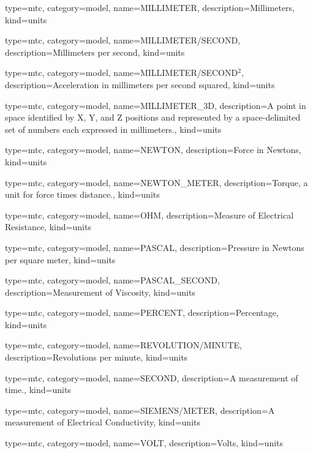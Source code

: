 {
  type=mtc,
  category=model,
  name={MILLIMETER},
  description={Millimeters},
  kind={units}
}


{
  type=mtc,
  category=model,
  name={MILLIMETER/SECOND},
  description={Millimeters per second},
  kind={units}
}


{
  type=mtc,
  category=model,
  name={MILLIMETER/SECOND$^2$},
  description={Acceleration in millimeters per second squared},
  kind={units}
}


{
  type=mtc,
  category=model,
  name={MILLIMETER\_3D},
  description={A point in space identified by X, Y, and Z positions and represented by a space-delimited set of numbers each expressed in millimeters.},
  kind={units}
}


{
  type=mtc,
  category=model,
  name={NEWTON},
  description={Force in Newtons},
  kind={units}
}


{
  type=mtc,
  category=model,
  name={NEWTON\_METER},
  description={Torque, a unit for force times distance.},
  kind={units}
}


{
  type=mtc,
  category=model,
  name={OHM},
  description={Measure of Electrical Resistance},
  kind={units}
}


{
  type=mtc,
  category=model,
  name={PASCAL},
  description={Pressure in Newtons per square meter},
  kind={units}
}


{
  type=mtc,
  category=model,
  name={PASCAL\_SECOND},
  description={Measurement of Viscosity},
  kind={units}
}


{
  type=mtc,
  category=model,
  name={PERCENT},
  description={Percentage},
  kind={units}
}


{
  type=mtc,
  category=model,
  name={REVOLUTION/MINUTE},
  description={Revolutions per minute},
  kind={units}
}


{
  type=mtc,
  category=model,
  name={SECOND},
  description={A measurement of time.},
  kind={units}
}


{
  type=mtc,
  category=model,
  name={SIEMENS/METER},
  description={A measurement of Electrical Conductivity},
  kind={units}
}


{
  type=mtc,
  category=model,
  name={VOLT},
  description={Volts},
  kind={units}
}



